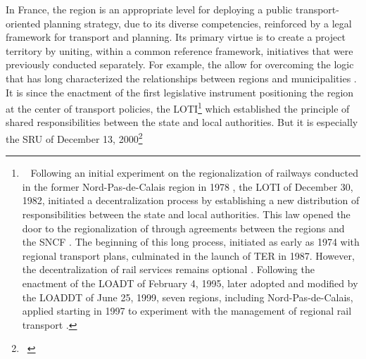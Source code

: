 \begin{refsegment}
In France, the region is an appropriate level for deploying a public transport-oriented planning strategy, due to its diverse competencies, reinforced by a legal framework for transport and planning. Its primary virtue is to create a project territory by uniting, within a common reference framework, initiatives that were previously conducted separately. For example, the  allow for overcoming the  logic that has long characterized the relationships between regions and municipalities \textcolor{blue}{\autocite[118]{bentayou_contrat_2015}}. It is since the enactment of the first legislative instrument positioning the region at the center of transport policies, the \acrfull{LOTI}\footnote{~
    Following an initial experiment on the regionalization of railways conducted in the former Nord-Pas-de-Calais region in 1978 \textcolor{blue}{\autocites[I-3]{chauvineau_regionalisation_2001}[424]{passavant-guion_financer_2016}}, the \acrfull{LOTI} of December 30, 1982, initiated a decentralization process by establishing a new distribution of responsibilities between the state and local authorities. This law opened the door to the regionalization of  through agreements between the regions and the SNCF \textcolor{blue}{\autocite[4]{deimon_projets_2024}}. The beginning of this long process, initiated as early as 1974 with regional transport plans, culminated in the launch of \acrfull{TER} in 1987. However, the decentralization of rail services remains optional \textcolor{blue}{\autocite{commission_nationale_du_debat_public_chronologie_nodate}}. Following the enactment of the \acrfull{LOADT} of February 4, 1995, later adopted and modified by the \acrfull{LOADDT} of June 25, 1999, seven regions, including Nord-Pas-de-Calais, applied starting in 1997 to experiment with the management of regional rail transport \textcolor{blue}{\autocite[132]{burlando_regionalisation_2004}}.
} which established the principle of shared responsibilities between the state and local authorities. But it is especially the \acrfull{SRU} of December 13, 2000\footnote{~
}
\end{refsegment}

